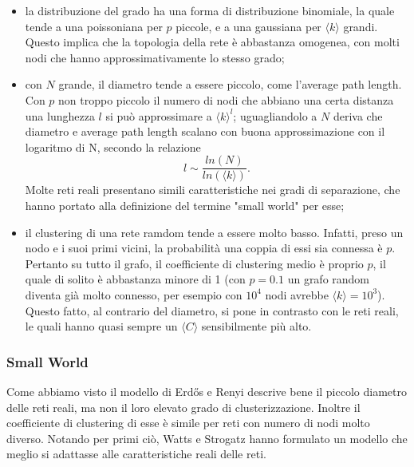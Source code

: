 \begin{itemize}
	\item la distribuzione del grado ha una forma di distribuzione binomiale, la quale tende a una poissoniana per $p$ piccole, e a una gaussiana per $\langle k \rangle$ grandi. Questo implica che la topologia della rete è abbastanza omogenea, con molti nodi che hanno approssimativamente lo stesso grado;
	
	\item con $N$ grande, il diametro tende a essere piccolo, come l'average path length. Con $p$ non troppo piccolo il numero di nodi che abbiano una certa distanza una lunghezza $l$ si può approssimare a $\langle k\rangle^l$; uguagliandolo a $N$ deriva che diametro e average path length scalano con buona approssimazione con il logaritmo di N, secondo la relazione
	\begin{equation}
	\label{eq:lunghezze}
	l \sim \frac{ln(N)}{ln(\langle k \rangle)}. 	 
	\end{equation}
	Molte reti reali presentano simili caratteristiche nei gradi di separazione, che hanno portato alla definizione del termine "small world" per esse;
	
	\item il clustering di una rete ramdom tende a essere molto basso. Infatti, preso un nodo e i suoi primi vicini, la probabilità una coppia di essi sia connessa è $p$. Pertanto su tutto il grafo, il coefficiente di clustering medio è proprio $p$, il quale di solito è abbastanza minore di 1 (con $p = 0.1$ un grafo random diventa già molto connesso, per esempio con $10^4$ nodi avrebbe $\langle k\rangle = 10^3$). Questo fatto, al contrario del diametro, si pone in contrasto con le reti reali, le quali hanno quasi sempre un $\langle C \rangle$ sensibilmente più alto.
\end{itemize}


\subsubsection{Small World}
Come abbiamo visto il modello di Erdős e Renyi descrive bene il piccolo diametro delle reti reali, ma non il loro elevato grado di clusterizzazione. Inoltre il coefficiente di clustering di esse è simile per reti con numero di nodi molto diverso. Notando per primi ciò, Watts e Strogatz hanno formulato un modello che meglio si adattasse alle caratteristiche reali delle reti. 

